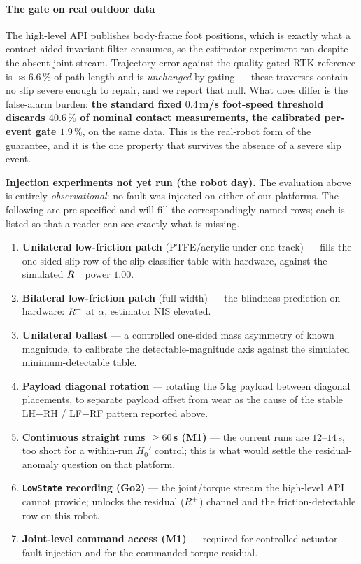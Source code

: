 \paragraph{The gate on real outdoor data}
The high-level API publishes body-frame foot positions, which is exactly what a contact-aided invariant filter consumes,
so the estimator experiment ran despite the absent joint stream. Trajectory error against the quality-gated RTK
reference is $\approx6.6\,\%$ of path length and is \emph{unchanged} by gating --- these traverses contain no slip severe
enough to repair, and we report that null. What does differ is the false-alarm burden: \textbf{the standard fixed
$0.4$\,m/s foot-speed threshold discards $40.6\,\%$ of nominal contact measurements, the calibrated per-event gate
$1.9\,\%$}, on the same data. This is the real-robot form of the guarantee, and it is the one property that survives the
absence of a severe slip event.

\begin{placeholderbox}
\textbf{Injection experiments not yet run (the robot day).} The evaluation above is entirely \emph{observational}: no
fault was injected on either of our platforms. The following are pre-specified and will fill the correspondingly named
rows; each is listed so that a reader can see exactly what is missing.
\begin{enumerate}\itemsep1pt
\item[(P1)] \textbf{Unilateral low-friction patch} (PTFE/acrylic under one track) --- fills the one-sided slip row of
  the slip-classifier table with hardware, against the simulated $R^{-}$ power $1.00$.
\item[(P2)] \textbf{Bilateral low-friction patch} (full-width) --- the blindness prediction on hardware: $R^{-}$ at
  $\alpha$, estimator NIS elevated.
\item[(P3)] \textbf{Unilateral ballast} --- a controlled one-sided mass asymmetry of known magnitude, to calibrate the
  detectable-magnitude axis against the simulated minimum-detectable table.
\item[(P4)] \textbf{Payload diagonal rotation} --- rotating the $5$\,kg payload between diagonal placements, to
  separate payload offset from wear as the cause of the stable LH$-$RH / LF$-$RF pattern reported above.
\item[(P5)] \textbf{Continuous straight runs $\ge60$\,s (M1)} --- the current runs are $12$--$14$\,s, too short for a
  within-run $H_0'$ control; this is what would settle the residual-anomaly question on that platform.
\item[(P6)] \textbf{\texttt{LowState} recording (Go2)} --- the joint/torque stream the high-level API cannot provide;
  unlocks the residual ($R^{+}$) channel and the friction-detectable row on this robot.
\item[(P7)] \textbf{Joint-level command access (M1)} --- required for controlled actuator-fault injection and for the
  commanded-torque residual.
\end{enumerate}
\end{placeholderbox}
